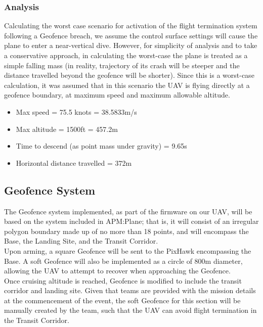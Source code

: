 \subsubsection{Analysis}
Calculating the worst case scenario for activation of the flight termination system following a Geofence breach, we assume the control surface settings will cause the plane to enter a near-vertical dive. However, for simplicity of analysis and to take a conservative approach, in calculating the worst-case the plane is treated as a simple falling mass (in reality, trajectory of its crash will be steeper and the distance travelled beyond the geofence will be shorter). Since this is a worst-case calculation, it was assumed that in this scenario the UAV is flying directly at a geofence boundary, at maximum speed and maximum allowable altitude.
\begin{itemize}
	\itemsep0em 
	\item Max speed = 75.5 knots = 38.5833m/s
	\item Max altitude = 1500ft = 457.2m
	\item Time to descend (as point mass under gravity) = 9.65s
	\item Horizontal distance travelled = 372m
\end{itemize}

\subsection{Geofence System}
The Geofence system implemented, as part of the firmware on our UAV, will be based on the system included in APM:Plane; that is, it will consist of an irregular polygon boundary made up of no more than 18 points, and will encompass the Base, the Landing Site, and the Transit Corridor.\\

Upon arming, a square Geofence will be sent to the PixHawk encompassing the Base. A soft Geofence will also be implemented as a circle of 800m diameter, allowing the UAV to attempt to recover when approaching the Geofence.\\

Once cruising altitude is reached, Geofence is modified to include the transit corridor and landing site. Given that teams are provided with the mission details at the commencement of the event, the soft Geofence for this section will be manually created by the team, such that the UAV can avoid flight termination in the Transit Corridor.\\

